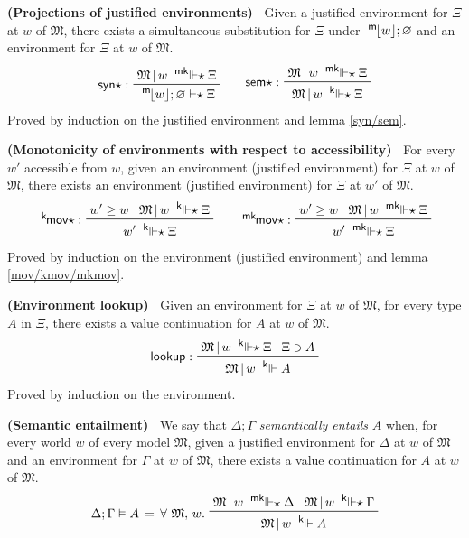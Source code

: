 \documentclass{entcs}
\numberwithin{equation}{thm}
\newcommand{\tsf}[1]{\textsf{\upshape{#1}}}
\newcommand{\stsf}[1]{\tsf{\small{#1}}}
\renewcommand{\:}{\mathrel{:}}
\newcommand{\tyrule}[1]{\prftree[l]{${#1} \:\,$}}
\let\oldforall\forall
\renewcommand{\forall}{\oldforall\,}
\newcommand{\0}{\varnothing}
\newcommand{\es}{\mathrel{\vdash\mkern-5mu\star}}
\newcommand{\M}{\mathfrak{M}}
\newcommand{\mpeek}[1]{\mathopen{^{\stsf{m}\mkern-3mu}\lfloor}{#1}\mathclose{\rfloor}}
\newcommand{\kee}{\mathrel{^{\stsf{k}\mkern-6mu}\Vdash}}
\newcommand{\kees}{\mathrel{^{\stsf{k}\mkern-6mu}\Vdash\mkern-5mu\star}}
\newcommand{\mkees}{\mathrel{^{\stsf{mk}\mkern-6mu}\Vdash\mkern-5mu\star}}
\newcommand{\syns}{\operatorname{\tsf{syn}\star}}
\newcommand{\sems}{\operatorname{\tsf{sem}\star}}
\newcommand{\eeq}{\mathrel{\vDash}}
\newcommand{\kmovs}{\operatorname{^{\stsf{k}\mkern-2mu}\tsf{mov}\star}}
\newcommand{\mkmovs}{\operatorname{^{\stsf{mk}\mkern-2mu}\tsf{mov}\star}}
\newcommand{\lookup}{\operatorname{\tsf{lookup}}}
\begin{document}
\begin{lemma}
  \normalshape
  \textbf{(Projections of justified environments)\ }
  \label{syns/sems}
  Given a justified environment for $\Xi$ at $w$ of $\M$, there exists a simultaneous substitution for $\Xi$ under $\mpeek{w}; \0$ and an environment for $\Xi$ at $w$ of $\M$.
  \begin{gather*}
    \tyrule{\syns}{\M\,|\, w \mkees \Xi}{\mpeek{w}; \0 \es \Xi}\qquad
    \tyrule{\sems}{\M\,|\, w \mkees \Xi}{\M\,|\, w \kees \Xi}
  \end{gather*}
  Proved by induction on the justified environment and lemma \ref{syn/sem}.
\end{lemma}

\begin{lemma}
  \normalshape
  \textbf{(Monotonicity of environments with respect to accessibility)\ }
  \label{kmovs/mkmovs}
  For every $w'$ accessible from $w$, given an environment (justified environment) for $\Xi$ at $w$ of $\M$, there exists an environment (justified environment) for $\Xi$ at $w'$ of $\M$.
  \begin{gather*}
    \tyrule{\kmovs}{w' \ge w}{\M\,|\, w \kees \Xi}{w' \kees \Xi}\qquad
    \tyrule{\mkmovs}{w' \ge w}{\M\,|\, w \mkees \Xi}{w' \mkees \Xi}
  \end{gather*}
  Proved by induction on the environment (justified environment) and lemma \ref{mov/kmov/mkmov}.
\end{lemma}

\begin{lemma}
  \normalshape
  \textbf{(Environment lookup)\ }
  \label{lookup}
  Given an environment for $\Xi$ at $w$ of $\M$, for every type $A$ in $\Xi$, there exists a value continuation for $A$ at $w$ of $\M$.
  \begin{gather*}
    \tyrule{\lookup}{\M\,|\,w \kees \Xi}{\Xi \ni A}{\M\,|\,w \kee A}
  \end{gather*}
  Proved by induction on the environment.
\end{lemma}

\begin{definition}
  \textbf{(Semantic entailment)\ }
  \label{eeq}
  We say that $\Delta; \Gamma$ \emph{semantically entails} $A$ when, for every world $w$ of every model $\M$, given a justified environment for $\Delta$ at $w$ of $\M$ and an environment for $\Gamma$ at $w$ of $\M$, there exists a value continuation for $A$ at $w$ of $\M$.
  \begin{gather*}
    \Delta; \Gamma \eeq A \,=\, \forall \M,\,w.\ \raisebox{-8pt}{$\prftree{\M\,|\,w \mkees \Delta}{\M\,|\,w \kees \Gamma}{\M\,|\,w \kee A}$}
  \end{gather*}
\end{definition}
\end{document}
